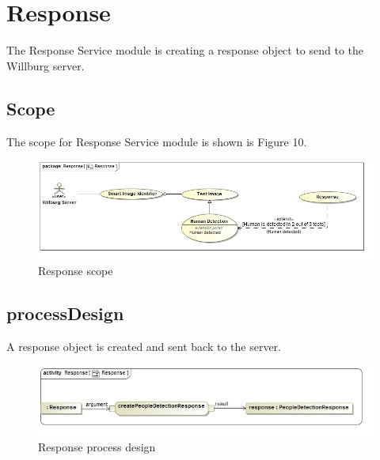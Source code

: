 \documentclass[a4paper,12pt]{report}
\begin{document}
	\section {Response}
		The Response Service module is creating a response object to send to the Willburg server.
		\subsection {Scope}
		The scope for Response Service module is shown is Figure 10.
			\begin{figure}[htb]
				\centering
				\includegraphics [scale=0.5]{../Diagrams/Response_Scope.jpg}
				\caption{Response scope}
			\end{figure}	
			\FloatBarrier
		
		
		\subsection {processDesign}
			A response object is created and sent back to the server.
			\FloatBarrier
			\begin{figure}[htb]
				\centering
				\includegraphics [scale=0.5]{../Diagrams/Response_ActivityDiagram.jpg}
				\caption{Response process design}
			\end{figure}	
			\FloatBarrier
\end{document}
